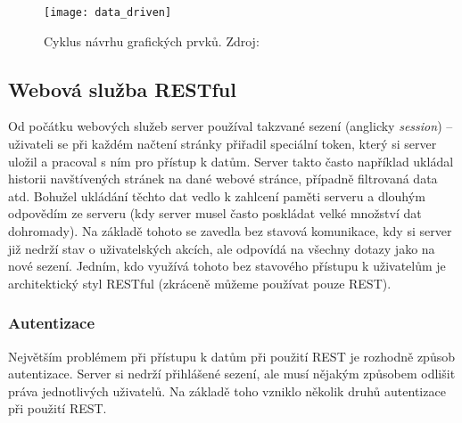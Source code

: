 \begin{figure}[h]
\centering
\texttt{[image: data\_driven]}
\caption[Cyklus návrhu grafických prvků]{Cyklus návrhu grafických prvků. Zdroj: \cite{the-ux-book}}
\label{data-cycle}
\end{figure}

\subsection{Webová služba RESTful}
\par Od počátku webových služeb server používal takzvané sezení (anglicky \textit{session}) -- uživateli se při každém načtení stránky přiřadil speciální token, který si server uložil a pracoval s ním pro přístup k datům. Server takto často například ukládal historii navštívených stránek na dané webové stránce, případně filtrovaná data atd. Bohužel ukládání těchto dat vedlo k zahlcení paměti serveru a dlouhým odpovědím ze serveru (kdy server musel často poskládat velké množství dat dohromady). Na základě tohoto se zavedla bez stavová komunikace, kdy si server již nedrží stav o uživatelských akcích, ale odpovídá na všechny dotazy jako na nové sezení. Jedním, kdo využívá tohoto bez stavového přístupu k uživatelům je architektický styl RESTful (zkráceně můžeme používat pouze REST). \cite{rest-cookbook}

\subsubsection{Autentizace}
Největším problémem při přístupu k datům při použití REST je rozhodně způsob autentizace. Server si nedrží přihlášené sezení, ale musí nějakým způsobem odlišit práva jednotlivých uživatelů. Na základě toho vzniklo několik druhů autentizace při použití REST. \cite{rest-cookbook}
